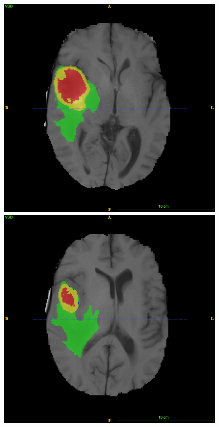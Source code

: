 \documentclass[12pt,a4paper,twoside,openright]{report}
\begin{document}
\begin{figure}[h]
	\includegraphics[scale=0.1]{expert_segmentation_89}
	\includegraphics[scale=0.1]{expert_segmentation_99}

\end{figure}
\end{document}
